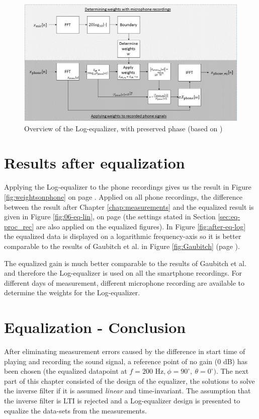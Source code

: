 \begin{figure}[b!]
    \centering
    \includegraphics[width=\textwidth]{afbeeldingen/log_equalizer.png}
    \caption[Overview Log-equalizer]{Overview of the Log-equalizer, with preserved phase (based on \cite{Thomas2006})}
    \label{fig:Log-eq}
\end{figure}

\section{Results after equalization}
\label{sec:eq-prelim}
Applying the Log-equalizer to the phone recordings gives us the result in Figure \ref{fig:weightsonphone} on page \pageref{fig:weightsonphone}.
Applied on all phone recordings, the difference between the result after Chapter \ref{chap:measurements} and the equalized result is given in Figure \ref{fig:06-eq-lin}, on page \pageref{fig:06-eq-lin} (the settings stated in Section \ref{sec:eq-proc_rec} are also applied on the equalized figures).
In Figure \ref{fig:after-eq-log} the equalized data is displayed on a logarithmic frequency-axis so it is better comparable to the results of Gaubitch et al. \cite{Gaubitch2014} in Figure \ref{fig:Gaubitch} (page \pageref{fig:Gaubitch}).

The equalized gain is much better comparable to the results of Gaubitch et al. and therefore the Log-equalizer is used on all the smartphone recordings.
For different days of measurement, different microphone recording are available to determine the weights for the Log-equalizer.

\section*{Equalization - Conclusion}
After eliminating measurement errors caused by the difference in start time of playing and recording the sound signal, a reference point of no gain (0 dB) has been chosen (the equalized datapoint at $f=200\text{ Hz,}~\phi=90^\circ,~\theta=0^\circ)$.
The next part of this chapter consisted of the design of the equalizer, the solutions to solve the inverse filter if it is assumed \textit{linear} and time-invariant.
The assumption that the inverse filter is LTI is rejected and a Log-equalizer design is presented to equalize the data-sets from the measurements.

